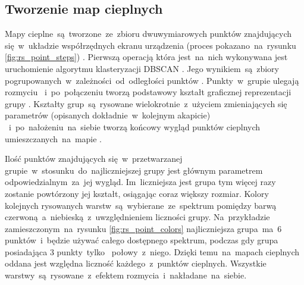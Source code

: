 \subsection{Tworzenie map cieplnych}
Mapy cieplne~są~tworzone~ze~zbioru dwuwymiarowych punktów znajdujących się~w~układzie współrzędnych ekranu urządzenia (proces pokazano~na~rysunku \ref{fig:rs_point_steps}) . Pierwszą operacją która jest~na~nich wykonywana jest uruchomienie algorytmu klasteryzacji DBSCAN \cite{DBSCAN_Wiki}. Jego wynikiem~są~zbiory pogrupowanych~w~zależności~od~odległości punktów . Punkty~w~grupie ulegają rozmyciu ~i~po~połączeniu tworzą podstawowy kształt graficznej reprezentacji grupy . Kształty grup~są~rysowane wielokrotnie~z~użyciem zmieniających się parametrów (opisanych dokładnie~w~kolejnym akapicie) ~i~po~nałożeniu~na~siebie tworzą końcowy wygląd punktów cieplnych umieszczanych~na~mapie .


Ilość punktów znajdujących się~w~przetwarzanej grupie~w~stosunku~do~najliczniejszej grupy jest głównym parametrem odpowiedzialnym~za~jej wygląd. Im~liczniejsza jest grupa tym więcej razy zostanie powtórzony jej kształt, osiągając coraz większy rozmiar. Kolory kolejnych rysowanych warstw~są~wybierane~ze~spektrum pomiędzy barwą czerwoną~a~niebieską~z~uwzględnieniem liczności grupy. Na~przykładzie zamieszczonym~na~rysunku \ref{fig:rs_point_colors} najliczniejsza grupa~ma~$6$ punktów~i~będzie używać całego dostępnego spektrum, podczas gdy grupa posiadająca $3$ punkty~tylko~ połowy~z~niego. Dzięki temu~na~mapach cieplnych oddana jest względna liczność każdego~z~punktów cieplnych. Wszystkie warstwy~są~rysowane~z~efektem rozmycia~i~nakładane~na~siebie. 

\bigskip
{}

